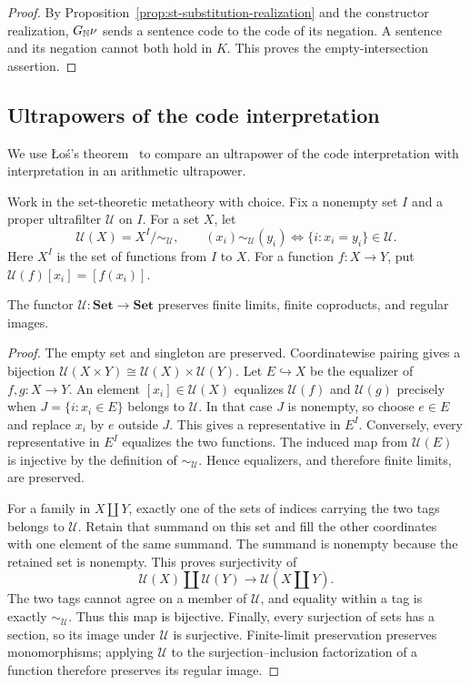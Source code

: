 \begin{proof}
By Proposition~\ref{prop:st-substitution-realization} and the
constructor realization, $G_{\mathbb N}\nu$ sends a sentence code to
the code of its negation. A sentence and its negation cannot
both hold in $K$. This proves the empty-intersection assertion.
\end{proof}

\subsection{Ultrapowers of the code interpretation}

We use \L o\'s's theorem~\cite[Theorem~3.1]{Keisler} to compare
an ultrapower of the code interpretation with interpretation in an
arithmetic ultrapower.

Work in the set-theoretic metatheory with choice. Fix a
nonempty set $I$ and a proper ultrafilter $\mathcal U$ on $I$.
For a set $X$, let
\[
 \mathscr U(X)=X^I/{\sim_{\mathcal U}},
 \qquad
 (x_i)\sim_{\mathcal U}(y_i)
 \Longleftrightarrow\{i:x_i=y_i\}\in\mathcal U.
\]
Here $X^I$ is the set of functions from $I$ to $X$. For a
function $f:X\to Y$, put
$\mathscr U(f)[x_i]=[f(x_i)]$.

\begin{lemma}\label{lem:ultrapower-regular}
The functor $\mathscr U:\mathbf{Set}\to\mathbf{Set}$ preserves
finite limits, finite coproducts, and regular images.
\end{lemma}
\begin{proof}
The empty set and singleton are preserved. Coordinatewise pairing
gives a bijection
$\mathscr U(X\times Y)\cong\mathscr U(X)\times\mathscr U(Y)$.
Let $E\hookrightarrow X$ be the equalizer of $f,g:X\to Y$.
An element $[x_i]\in\mathscr U(X)$ equalizes
$\mathscr U(f)$ and $\mathscr U(g)$ precisely when
$J=\{i:x_i\in E\}$ belongs to $\mathcal U$. In that case
$J$ is nonempty, so choose $e\in E$ and replace $x_i$ by $e$
outside $J$. This gives a representative in $E^I$. Conversely,
every representative in $E^I$ equalizes the two functions.
The induced map from $\mathscr U(E)$ is injective by the
definition of $\sim_{\mathcal U}$. Hence equalizers, and
therefore finite limits, are preserved.

For a family in $X\amalg Y$, exactly one of the sets of indices
carrying the two tags belongs to $\mathcal U$. Retain that
summand on this set and fill the other coordinates with one
element of the same summand. The summand is nonempty because
the retained set is nonempty. This proves surjectivity of
\[
 \mathscr U(X)\amalg\mathscr U(Y)
       \longrightarrow\mathscr U(X\amalg Y).
\]
The two tags cannot agree on a member of $\mathcal U$, and
equality within a tag is exactly $\sim_{\mathcal U}$. Thus this
map is bijective. Finally, every surjection of sets has a section,
so its image under $\mathscr U$ is surjective. Finite-limit
preservation preserves monomorphisms; applying $\mathscr U$ to
the surjection--inclusion factorization of a function therefore
preserves its regular image.
\end{proof}

